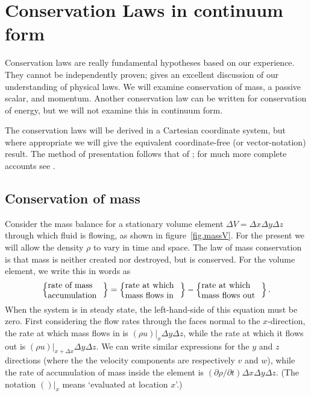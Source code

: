 \documentclass[twoside,11pt]		{report}
\begin{document}
\chapter{Conservation Laws in continuum form}
\label{ch.cons}

Conservation laws are really fundamental hypotheses based on our
experience. They cannot be independently proven; \citet{feynman67}
gives an excellent discussion of our understanding of physical
laws. We will examine conservation of mass, a passive scalar, and
momentum. Another conservation law can be written for conservation of
energy, but we will not examine this in continuum form. 

The conservation laws will be derived in a Cartesian coordinate
system, but where appropriate we will give the equivalent
coordinate-free (or vector-notation) result. The method of
presentation follows that of \citet*{bsl62}; for much more complete
accounts see \citet{aris62,bat67,fung69}.

\section{Conservation of mass}

Consider the mass balance for a stationary volume element $\Delta
V=\Delta x\Delta y\Delta z$ through which fluid is flowing, as shown
in figure~\ref{fig.massV}. For the present we will allow the density
$\rho$ to vary in time and space. The law of mass conservation is that
mass is neither created nor destroyed, but is conserved. For the
volume element, we write this in words as
\begin{equation}
\left\{ \parbox{23mm}{rate of mass\\ accumulation} \right\}=
\left\{ \parbox{23mm}{rate at which\\ mass flows in} \right\}-
\left\{ \parbox{25mm}{rate at which\\ mass flows out} \right\}.
\label{eq.mass_bal_words}
\end{equation}
When the system is in steady state, the left-hand-side of this
equation must be zero.  First considering the flow rates through the
faces normal to the $x$-direction, the rate at which mass flows in is
$(\rho u)|_x \Delta y\Delta z$, while the rate at which it flows out
is $(\rho u)|_{x + \Delta x} \Delta y\Delta z$. We can write similar
expressions for the $y$ and $z$ directions (where the the velocity
components are respectively $v$ and $w$), while the rate of
accumulation of mass inside the element is $(\partial \rho/\partial
t)\Delta x\Delta y\Delta z$. (The notation $()|_x$ means `evaluated at
location $x$'.)
\end{document}
